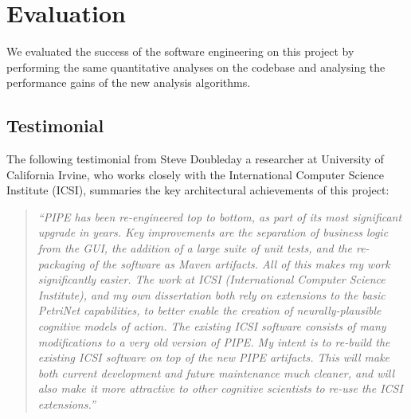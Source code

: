 \section{Evaluation}
We evaluated the success of the software engineering on this project by performing the same quantitative analyses on the codebase and analysing the performance gains of the new analysis algorithms.






\subsection{Testimonial}
The following testimonial from Steve Doubleday a researcher at University of California Irvine, who works closely with the International Computer Science Institute (ICSI), summaries the key architectural achievements of this project:

\begin{quote}
\singlespacing
    \textit{``PIPE has been re-engineered top to bottom, as part of its most significant upgrade in years. Key improvements are the separation of business logic from the GUI, the addition of a large suite of unit tests, and the re-packaging of the software as Maven artifacts.  All of this makes my work significantly easier. The work at ICSI (International Computer Science Institute), and my own dissertation both rely on extensions to the basic PetriNet capabilities, to better enable the creation of neurally-plausible cognitive models of action. The existing ICSI software consists of many modifications to a very old version of PIPE. My intent is to re-build the existing ICSI software on top of the new PIPE artifacts. This will make both current development and future maintenance much cleaner, and will also make it more attractive to other cognitive scientists to re-use the ICSI extensions.''}
\end{quote}
